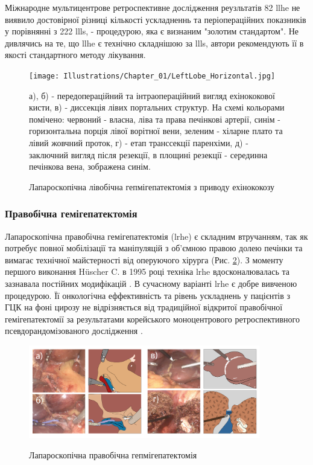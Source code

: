\begin{refsection}
Міжнародне мультицентрове ретроспективне дослідження реузльтатів 82 \acrshort{llhe} \cite{Belli2013a} не виявило достовірної різниці кількості ускладненнь та періопераційних показників у порівнянні з 222 \acrshort{llls}, - процедурою, яка є визнаним "золотим стандартом". Не дивлячись на те, що \acrshort{llhe} є технічно складнішою за \acrshort{llls}, автори рекомендують її в якості стандартного методу лікування. 

\begin{figure}[htbp]
\caption{Лапароскопічна лівобічна гепмігепатектомія з приводу ехінококозу}

\texttt{[image: Illustrations/Chapter\_01/LeftLobe\_Horizontal.jpg]}
\label{fig:LeftLobe}

\medskip
\small
 а), б) - передопераційний та інтраопераційний вигляд ехінококової кисти, в) - диссекція лівих портальних структур. На схемі кольорами помічено: червоний - власна, ліва та права печінкові артерії, синім - горизонтальна порція лівої ворітної вени, зеленим - хіларне плато та лівий жовчний проток, г) - етап транссекції паренхіми, д) - заключний вигляд після резекції, в площині резекції - серединна печінкова вена, зображена синім.

\end{figure}

\subsubsection{Правобічна гемігепатектомія}

Лапароскопічна правобічна гемігепатектомія (\acrshort{lrhe}) є складним втручанням, так як потребує повної мобілізації та маніпуляцій з об'ємною правою долею печінки та вимагає технічної майстерності від оперуючого хірурга (Рис. \ref{fig:RightLobe}). З моменту першого виконання Hüscher C. в 1995 році \cite{Huscher1997} техніка \acrshort{lrhe} вдосконалювалась та зазнавала постійних модифікацій \cite{Gayet2007, Dagher2008, Homma2019, Kim2017a}. В сучасному варіанті \acrshort{lrhe} є добре вивченою процедурою. Її онкологічна еффективність та рівень ускладнень у пацієнтів з ГЦК на фоні цирозу не відрізняється від традиційної відкритої правобічної гемігепатектомії за результатами корейського моноцентрового ретроспективного псевдорандомізованого дослідження \cite{Yoon2017b}. 

\begin{figure}[htbp]
\caption{Лапароскопічна правобічна гепмігепатектомія}

\includegraphics[width=0.9\textwidth]{Illustrations/Chapter_01/RightLobe_Horizontal.png}
\label{fig:RightLobe}


\end{figure}
\end{refsection}
